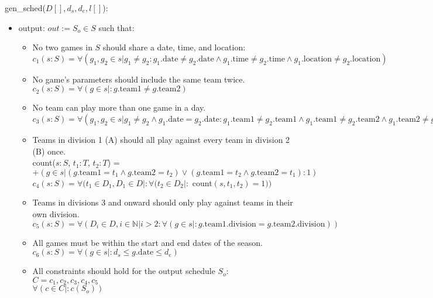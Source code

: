 \documentclass[12pt, titlepage]{article}
\begin{document}
\noindent gen\_sched($D[], d_s, d_e, l[]$):
\begin{itemize}
\item output: $out := S_o \in S$ such that:
\begin{itemize}
  \item No two games in $S$ should share a date, time, and location:\\
  $c_1(s:S) = \forall(g_1, g_2 \in s | g_1 \neq g_2 : g_1.\text{date} \neq
  g_2.\text{date} \land g_1.\text{time} \neq g_2.\text{time} \land g_1.\text{location} \neq g_2.\text{location})$
  \item No game's parameters should include the same team twice.\\
  $c_2(s:S) = \forall (g \in s |: g.\text{team1} \neq g.\text{team2})$
  \item No team can play more than one game in a day.\\
  $c_3(s:S) = \forall (g_1, g_2 \in s |g_1 \neq g_2 \land g_1.\text{date} =
  g_2.\text{date} : g_1.\text{team1} \neq g_2.\text{team1} \land g_1.\text{team1} \neq g_2.\text{team2} \land
  g_1.\text{team2} \neq g_2.\text{team1} \land g_1.\text{team2} \neq g_2.\text{team2})$
  \item Teams in division 1 (A) should all play against every team in division
  2 (B) once.\\
  count($s:S$, $t_1:T$, $t_2:T$) = $+(g \in s | (g.\text{team1} = t_1 \land
  g.\text{team2} = t_2) \lor (g.\text{team1} = t_2 \land g.\text{team2} = t_1) : 1)$\\
  $c_4(s:S) = \forall (t_1 \in D_1, D_1 \in D |: \forall (t_2 \in D_2 |:$ count$(s, t_1,
  t_2) = 1))$
  \item Teams in divisions 3 and onward should only play against teams in
  their own division.\\
  $c_5(s:S) = \forall (D_i \in D, i \in \mathbb{N} | i > 2 : \forall (g \in s |:
  g.\text{team1}.\text{division} = g.\text{team2}.\text{division}))$
  \item All games must be within the start and end dates of the season.\\
  $c_6(s:S) = \forall (g \in s |: d_s \leq g.\text{date} \leq d_e)$
  \item All constraints should hold for the output schedule $S_o$:\\
  $C = {c_1, c_2, c_3, c_4, c_5}$\\
  $\forall(c \in C |: c(S_o))$
\end{itemize}
\end{itemize}
\end{document}
